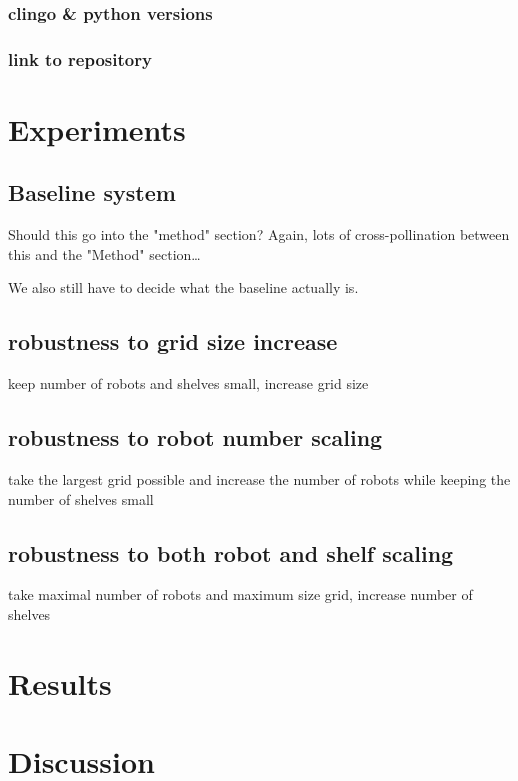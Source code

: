 \documentclass[11pt]{article}
\begin{document}
\subsubsection{clingo \& python versions}
\label{sec:orgafdeea4}
\subsubsection{link to repository}
\label{sec:org1186d62}
\section{Experiments}
\label{sec:org2c68a51}
\subsection{Baseline system}
\label{sec:orgfa37f02}
Should this go into the "method" section? Again, lots of cross-pollination between this and the "Method" section\ldots{}

We also still have to decide what the baseline actually is.
\subsection{robustness to grid size increase}
\label{sec:org8de6962}
keep number of robots and shelves small, increase grid size
\subsection{robustness to robot number scaling}
\label{sec:org57fcbab}
take the largest grid possible and increase the number of robots while keeping the number of shelves small
\subsection{robustness to both robot and shelf scaling}
\label{sec:org6fbb893}
take maximal number of robots and maximum size grid, increase number of shelves
\section{Results}
\label{sec:orgc00c63b}
\section{Discussion}
\label{sec:orgc36b766}
\end{document}
